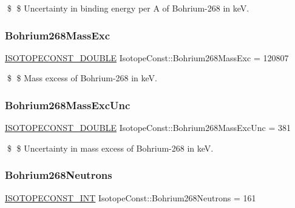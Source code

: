 \$ \$ Uncertainty in binding energy per A of Bohrium-\/268 in keV. \mbox{\label{group___isotope_const-_bohrium-_bh268_ga872d9cf2cdcecc16304b49164cf3e961}} 
\subsubsection{\texorpdfstring{Bohrium268\+Mass\+Exc}{Bohrium268MassExc}}
{\footnotesize\ttfamily \mbox{\hyperlink{group___isotope_const-_macros_ga8f45a7272ce02c0b4c65c44636ed719a}{I\+S\+O\+T\+O\+P\+E\+C\+O\+N\+S\+T\+\_\+\+D\+O\+U\+B\+LE}} Isotope\+Const\+::\+Bohrium268\+Mass\+Exc = 120807}

\$ \$ Mass excess of Bohrium-\/268 in keV. \mbox{\label{group___isotope_const-_bohrium-_bh268_gafaae9748908cd6326530283173cff7fe}} 
\subsubsection{\texorpdfstring{Bohrium268\+Mass\+Exc\+Unc}{Bohrium268MassExcUnc}}
{\footnotesize\ttfamily \mbox{\hyperlink{group___isotope_const-_macros_ga8f45a7272ce02c0b4c65c44636ed719a}{I\+S\+O\+T\+O\+P\+E\+C\+O\+N\+S\+T\+\_\+\+D\+O\+U\+B\+LE}} Isotope\+Const\+::\+Bohrium268\+Mass\+Exc\+Unc = 381}

\$ \$ Uncertainty in mass excess of Bohrium-\/268 in keV. \mbox{\label{group___isotope_const-_bohrium-_bh268_gafd71fa13d8c1ffe6fc7794f1a0b93067}} 
\subsubsection{\texorpdfstring{Bohrium268\+Neutrons}{Bohrium268Neutrons}}
{\footnotesize\ttfamily \mbox{\hyperlink{group___isotope_const-_macros_ga5f18360b3e99483a35c32d789e62621c}{I\+S\+O\+T\+O\+P\+E\+C\+O\+N\+S\+T\+\_\+\+I\+NT}} Isotope\+Const\+::\+Bohrium268\+Neutrons = 161}

